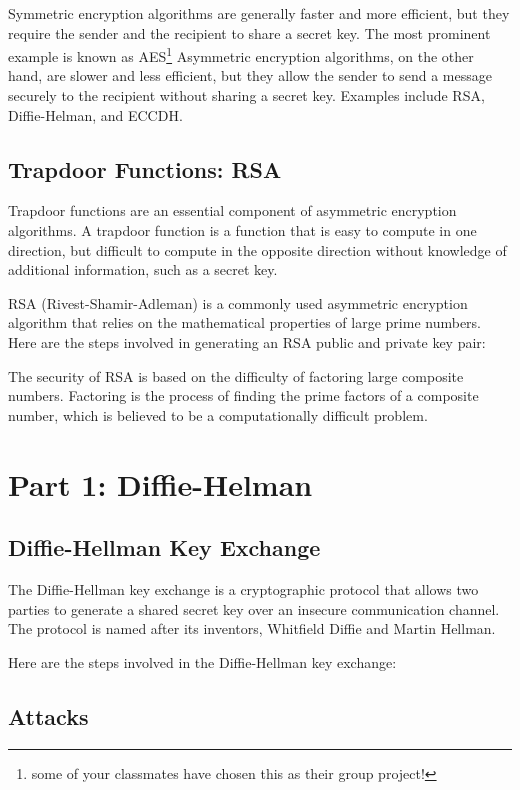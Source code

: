 \documentclass{article}
\begin{document}
Symmetric encryption algorithms are generally faster and more efficient, but they require the sender and the recipient to share a secret key. The most prominent example is known as AES\footnote{some of your classmates have chosen this as their group project!} Asymmetric encryption algorithms, on the other hand, are slower and less efficient, but they allow the sender to send a message securely to the recipient without sharing a secret key. Examples include RSA, Diffie-Helman, and ECCDH.

\subsection*{Trapdoor Functions: RSA}

Trapdoor functions are an essential component of asymmetric encryption algorithms. A trapdoor function is a function that is easy to compute in one direction, but difficult to compute in the opposite direction without knowledge of additional information, such as a secret key.

RSA (Rivest-Shamir-Adleman) is a commonly used asymmetric encryption algorithm that relies on the mathematical properties of large prime numbers. Here are the steps involved in generating an RSA public and private key pair:

The security of RSA is based on the difficulty of factoring large composite numbers. Factoring is the process of finding the prime factors of a composite number, which is believed to be a computationally difficult problem.

\section*{Part 1: Diffie-Helman}

\subsection*{Diffie-Hellman Key Exchange}

The Diffie-Hellman key exchange is a cryptographic protocol that allows two parties to generate a shared secret key over an insecure communication channel. The protocol is named after its inventors, Whitfield Diffie and Martin Hellman.

Here are the steps involved in the Diffie-Hellman key exchange:

\subsection{Attacks}
\end{document}
